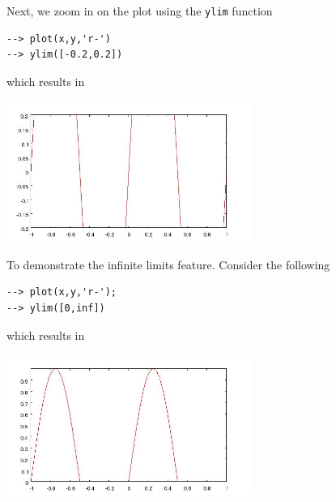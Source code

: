 Next, we zoom in on the plot using the \verb|ylim| function
\begin{verbatim}
--> plot(x,y,'r-')
--> ylim([-0.2,0.2])
\end{verbatim}
which results in


\centerline{\includegraphics[width=8cm]{ylim2}}

To demonstrate the infinite limits feature.  Consider the following
\begin{verbatim}
--> plot(x,y,'r-');
--> ylim([0,inf])
\end{verbatim}
which results in 


\centerline{\includegraphics[width=8cm]{ylim3}}

